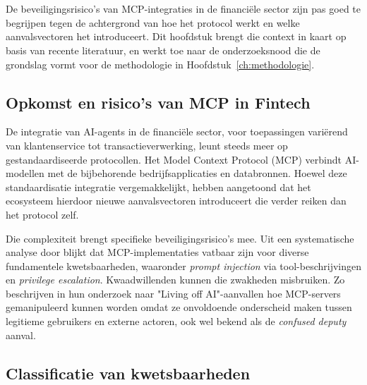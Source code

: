 \chapter{}%
\label{ch:stand-van-zaken}



De beveiligingsrisico's van MCP-integraties in de financiële sector zijn pas goed te begrijpen tegen de achtergrond van hoe het protocol werkt en welke aanvalsvectoren het introduceert. Dit hoofdstuk brengt die context in kaart op basis van recente literatuur, en werkt toe naar de onderzoeksnood die de grondslag vormt voor de methodologie in Hoofdstuk~\ref{ch:methodologie}.

\section{Opkomst en risico's van MCP in Fintech}

De integratie van AI-agents in de financiële sector, voor toepassingen variërend van klantenservice tot transactieverwerking, leunt steeds meer op gestandaardiseerde protocollen. Het Model Context Protocol (MCP) verbindt AI-modellen met de bijbehorende bedrijfsapplicaties en databronnen. Hoewel deze standaardisatie integratie vergemakkelijkt, hebben \textcite{song2025protocolunveilingattackvectors} aangetoond dat het ecosysteem hierdoor nieuwe aanvalsvectoren introduceert die verder reiken dan het protocol zelf.

Die complexiteit brengt specifieke beveiligingsrisico's mee. Uit een systematische analyse door \textcite{guo2025systematicanalysismcpsecurity} blijkt dat MCP-implementaties vatbaar zijn voor diverse fundamentele kwetsbaarheden, waaronder \emph{prompt injection} via tool-beschrijvingen en \emph{privilege escalation}. Kwaadwillenden kunnen die zwakheden misbruiken. Zo beschrijven \textcite{Cato2025} in hun onderzoek naar "Living off AI"-aanvallen hoe MCP-servers gemanipuleerd kunnen worden omdat ze onvoldoende onderscheid maken tussen legitieme gebruikers en externe actoren, ook wel bekend als de \emph{confused deputy} aanval.

\section{Classificatie van kwetsbaarheden}

